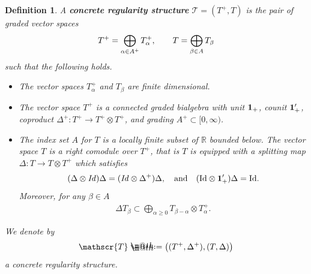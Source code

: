 \documentclass[10pt, reqno]{amsart}
\makeatletter
\numberwithin{subsection}{section}
\numberwithin{subsubsection}{subsection}
\numberwithin{equation}{section} %
\theoremstyle{mystyle}
\theoremstyle{mystyle2}
\newtheorem*{defn*} {Definition}
\theoremstyle{mystyle3}
\newcommand{\iden}{\text{\rm Id}}
\newcommand\bbR{\mathbb{R}}
\newcommand*{\defeq}{\mathrel{\rlap{%
                     \raisebox{0.3ex}{$\m@th\cdot$}}%
                     \raisebox{-0.3ex}{$\m@th\cdot$}}%
                     =}
\makeatother
\begin{document}
\begin{defn*}
A \textsf{\textbf{concrete regularity structure}} $\mathscr{T}=(T^+,T)$ 
is the pair of graded vector spaces   \vspace{-0.1cm}
$$
T^+ = \bigoplus_{\alpha\in A^+} T_\alpha^+, \qquad T = \bigoplus_{\beta\in A} T_\beta   \vspace{-0.1cm}
$$
such that the following holds.   \vspace{0.1cm}

\begin{itemize}
\setlength{\itemsep}{0.1cm}
   \item The vector spaces $T_\alpha^+$ and $T_\beta$ are finite dimensional.   \vspace{0.1cm}
   
   \item The vector space $T^+$ is a connected graded bialgebra with unit 
${\bf1}_+$, counit ${\bf1}_+'$, coproduct $\Delta^+:T^+\to T^+\otimes T^+$, and grading $A^+\subset[0,\infty)$.   \vspace{0.1cm}

   \item The index set $A$ for $T$ is a locally finite subset of $\bbR$ bounded below. The vector space $T$ is a right comodule over $T^+$, that is $T$ is equipped with a splitting map $\Delta : T \rightarrow T\otimes T^+$ which satisfies 
\begin{align} \label{eq T is comodule}
(\Delta\otimes \textrm{\emph{Id}})\Delta = (\textrm{\emph{Id}}\otimes \Delta^+)\Delta,\quad\textrm{and}\quad (\iden\otimes{\bf1}_+')\Delta=\iden. 
\end{align}
Moreover, for any $\beta\in A$ 
\begin{align}\label{eq T is graded}
\Delta T_\beta \subset \bigoplus_{\alpha\geq 0}T_{\beta-\alpha}\otimes T_\alpha^+.
\end{align}
\end{itemize}
We denote by 
$$
\mathscr{T} \defeq  \big((T^+,\Delta^+), (T,\Delta)\big)
$$
a concrete regularity structure.
\end{defn*}

\medskip
\end{document}
